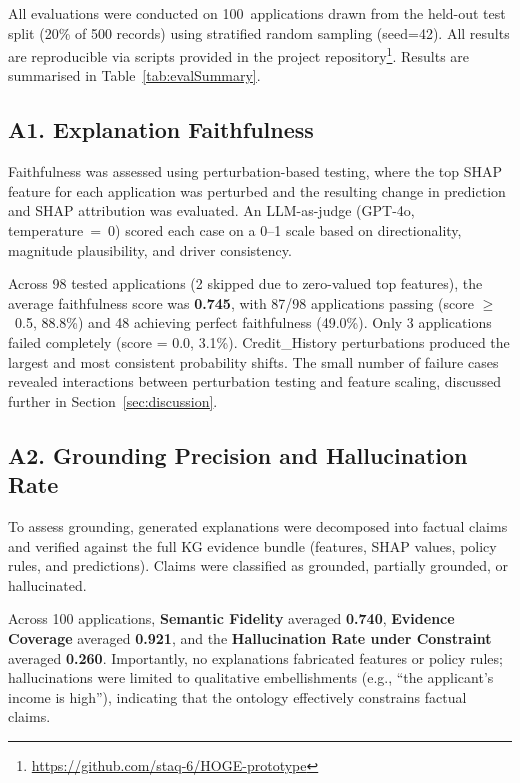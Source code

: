 \documentclass[lnbip]{svmultln}
\begin{document}
All evaluations were conducted on 100~applications drawn from the held-out test split (20\% of 500 records) using stratified random sampling (seed=42). All results are reproducible via scripts provided in the project repository\footnote{\url{https://github.com/staq-6/HOGE-prototype}}. Results are summarised in Table~\ref{tab:evalSummary}.

\subsection{A1. Explanation Faithfulness}

Faithfulness was assessed using perturbation-based testing, where the top SHAP feature for each application was perturbed and the resulting change in prediction and SHAP attribution was evaluated. An LLM-as-judge (GPT-4o, temperature~=~0) scored each case on a 0--1 scale based on directionality, magnitude plausibility, and driver consistency.

Across 98 tested applications (2 skipped due to zero-valued top features), the average faithfulness score was \textbf{0.745}, with 87/98 applications passing (score $\geq$~0.5, 88.8\%) and 48 achieving perfect faithfulness (49.0\%). Only 3 applications failed completely (score = 0.0, 3.1\%). Credit\_History perturbations produced the largest and most consistent probability shifts. The small number of failure cases revealed interactions between perturbation testing and feature scaling, discussed further in Section~\ref{sec:discussion}.

\subsection{A2. Grounding Precision and Hallucination Rate}

To assess grounding, generated explanations were decomposed into factual claims and verified against the full KG evidence bundle (features, SHAP values, policy rules, and predictions). Claims were classified as grounded, partially grounded, or hallucinated.

Across 100 applications, \textbf{Semantic Fidelity} averaged \textbf{0.740}, \textbf{Evidence Coverage} averaged \textbf{0.921}, and the \textbf{Hallucination Rate under Constraint} averaged \textbf{0.260}. Importantly, no explanations fabricated features or policy rules; hallucinations were limited to qualitative embellishments (e.g., ``the applicant's income is high''), indicating that the ontology effectively constrains factual claims.
\end{document}
